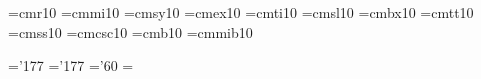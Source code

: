 \def\ixpt{\ifmmode\err@badsizechange\else
     \@mathfontinit
     \textfont0=\ixptrm  \scriptfont0=\viiptrm  \scriptscriptfont0=\vptrm
     \textfont1=\ixptmit \scriptfont1=\viiptmit \scriptscriptfont1=\vptmit
     \textfont2=\ixptsy  \scriptfont2=\viiptsy  \scriptscriptfont2=\vptsy
     \textfont3=\xptex   \scriptfont3=\xptex    \scriptscriptfont3=\xptex
     \textfont\itfam=\ixptit
     \scriptfont\itfam=\viiptit
     \scriptscriptfont\itfam=\viiptit
     \textfont\bffam=\ixptbf
     \scriptfont\bffam=\viiptbf
     \scriptscriptfont\bffam=\vptbf
     \@fontstyleinit
     \def\rm{\ixptrm\fam=\z@}%
     \def\it{\ixptit\fam=\itfam}%
     \def\bf{\ixptbf\fam=\bffam}%
     \def\oldstyle{\ixptmit\fam=\@ne}%
     \rm\fi}


\font\xptrm=cmr10
\font\xptmit=cmmi10
\font\xptsy=cmsy10
\font\xptex=cmex10
\font\xptit=cmti10
\font\xptsl=cmsl10
\font\xptbf=cmbx10
\font\xpttt=cmtt10
\font\xptss=cmss10
\font\xptsc=cmcsc10
\font\xptbfs=cmb10
\font\xptbmit=cmmib10

\skewchar\xptmit='177 \skewchar\xptbmit='177 \skewchar\xptsy='60
 \xptsy=\the{} \xptsy

\def\xpt{\ifmmode\err@badsizechange\else
     \@mathfontinit
     \textfont0=\xptrm  \scriptfont0=\viiptrm  \scriptscriptfont0=\vptrm
     \textfont1=\xptmit \scriptfont1=\viiptmit \scriptscriptfont1=\vptmit
     \textfont2=\xptsy  \scriptfont2=\viiptsy  \scriptscriptfont2=\vptsy
     \textfont3=\xptex  \scriptfont3=\xptex    \scriptscriptfont3=\xptex
     \textfont\itfam=\xptit
     \scriptfont\itfam=\viiptit
     \scriptscriptfont\itfam=\viiptit
     \textfont\bffam=\xptbf
     \scriptfont\bffam=\viiptbf
     \scriptscriptfont\bffam=\vptbf
     \textfont\bfsfam=\xptbfs
     \scriptfont\bfsfam=\viiptbf
     \scriptscriptfont\bfsfam=\vptbf
     \textfont\bmitfam=\xptbmit
     \scriptfont\bmitfam=\viiptmit
     \scriptscriptfont\bmitfam=\vptmit
     \@fontstyleinit
     \def\rm{\xptrm\fam=\z@}%
     \def\it{\xptit\fam=\itfam}%
     \def\sl{\xptsl}%
     \def\bf{\xptbf\fam=\bffam}%
     \def\tt{\xpttt}%
     \def\ss{\xptss}%
     \def\sc{\xptsc}%
     \def\bfs{\xptbfs\fam=\bfsfam}%
     \def\bmit{\fam=\bmitfam}%
     \def\oldstyle{\xptmit\fam=\@ne}%
     \rm\fi}


\def\getxipt{%
     \font\xiptrm=cmr10  scaled\magstephalf
     \font\xiptmit=cmmi10 scaled\magstephalf
     \font\xiptsy=cmsy10 scaled\magstephalf
     \font\xiptex=cmex10 scaled\magstephalf
     \font\xiptit=cmti10 scaled\magstephalf
     \font\xiptsl=cmsl10 scaled\magstephalf
     \font\xiptbf=cmbx10 scaled\magstephalf
     \font\xipttt=cmtt10 scaled\magstephalf
     \font\xiptss=cmss10 scaled\magstephalf
     \skewchar\xiptmit='177 \skewchar\xiptsy='60
     \fontdimen16 \xiptsy=\the\fontdimen17 \xiptsy}

